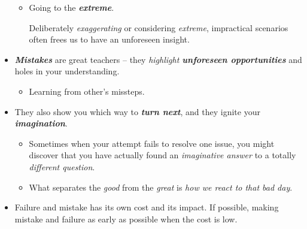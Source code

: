 \documentclass[11pt]{article}
\begin{document}
\begin{itemize}
\begin{itemize}
\item Going to the \emph{\textbf{extreme}}. 

Deliberately \emph{exaggerating} or considering \emph{extreme}, impractical scenarios often frees us to have an unforeseen insight.
\end{itemize}

\item \emph{\textbf{Mistakes}} are great teachers -- they \emph{highlight \textbf{unforeseen opportunities}} and holes in your understanding. 
\begin{itemize}
\item Learning from other’s missteps.
\end{itemize}

\item They also show you which way to \emph{\textbf{turn next}}, and they ignite your \emph{\textbf{imagination}}.
\begin{itemize}
\item Sometimes when your attempt fails to resolve one issue, you might discover that you have actually found an \emph{imaginative answer} to a totally \emph{different question}.

\item What separates the \emph{good} from the \emph{great} is \emph{how we react to that bad day}.
\end{itemize}

\item Failure and mistake has its own cost and its impact. If possible, making mistake and failure as early as possible when the cost is low.
\end{itemize}
\end{document}

